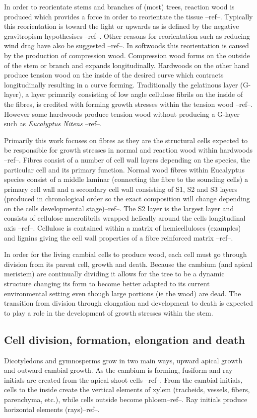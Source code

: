 \documentclass{article}
\begin{document}
In order to reorientate stems and branches of (most) trees, reaction wood is
produced which provides a force in order to reorientate the tissue --ref--.
Typically this reorientation is toward the light or upwards as is defined by the
negative gravitropism hypothesises --ref--. Other reasons for reorientation such
as reducing wind drag have also be suggested --ref--. In softwoods this
reorientation is caused by the production of compression wood. Compression wood
forms on the outside of the stem or branch and expands longitudinally. Hardwoods
on the other hand produce tension wood on the inside of the desired curve which
contracts longitudinally resulting in a curve forming. Traditionally the
gelatinous layer (G-layer), a layer primarily consisting of low angle cellulose
fibrils on the inside of the fibres, is credited with forming growth stresses
within the tension wood --ref--. However some hardwoods produce tension wood
without producing a G-layer such as \textit{Eucalyptus Nitens} --ref--.

Primarily this work focuses on fibres as they are the structural cells expected
to be responsible for growth stresses in normal and reaction wood within
hardwoods --ref--. Fibres consist of a number of cell wall layers depending on
the species, the particular cell and its primary function. Normal wood fibres
within Eucalyptus species consist of a middle laminar (connecting the fibre to
the sounding cells) a primary cell wall and a secondary cell wall consisting of
S1, S2 and S3 layers (produced in chronological order so the exact composition
will change depending on the cells developmental stage)--ref--. The S2 layer is
the largest layer and consists of cellulose macrofibrils wrapped helically
around the cells longitudinal axis --ref--. Cellulose is contained within a
matrix of hemicelluloses (examples) and lignins giving the cell wall properties
of a fibre reinforced matrix --ref--.

In order for the living cambial cells to produce wood, each cell must go through
division from its parent cell, growth and death. Because the cambium (and apical
meristem) are continually dividing it allows for the tree to be a dynamic
structure changing its form to become better adapted to its current
environmental setting even though large portions (ie the wood) are dead. The
transition from division through elongation and development to death is expected
to play a role in the development of growth stresses within the stem.

\subsection{Cell division, formation, elongation and death}
Dicotyledons and gymnosperms grow in two main ways, upward apical growth and
outward cambial growth.  As the cambium is forming, fusiform and ray initials
are created from the apical shoot cells --ref--. From the cambial initials,
cells to the inside create the vertical elements of xylem (tracheids, vessels,
fibers, parenchyma, etc.), while cells outside become phloem--ref--. Ray
initials produce horizontal elements (rays)--ref--.
\end{document}
